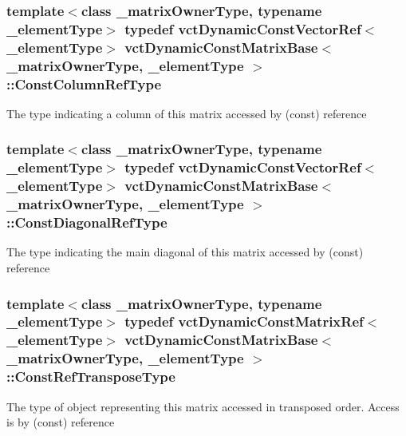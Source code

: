\subsubsection[{Const\+Column\+Ref\+Type}]{\setlength{\rightskip}{0pt plus 5cm}template$<$class \+\_\+matrix\+Owner\+Type, typename \+\_\+element\+Type$>$ typedef {\bf vct\+Dynamic\+Const\+Vector\+Ref}$<$\+\_\+element\+Type$>$ {\bf vct\+Dynamic\+Const\+Matrix\+Base}$<$ \+\_\+matrix\+Owner\+Type, \+\_\+element\+Type $>$\+::{\bf Const\+Column\+Ref\+Type}}\label{classvct_dynamic_const_matrix_base_ac8caf37f979246b1ae99d6e6876879e0}
The type indicating a column of this matrix accessed by (const) reference \hypertarget{classvct_dynamic_const_matrix_base_aa497314340719c9e70a4991d3f306d7e}{}
\subsubsection[{Const\+Diagonal\+Ref\+Type}]{\setlength{\rightskip}{0pt plus 5cm}template$<$class \+\_\+matrix\+Owner\+Type, typename \+\_\+element\+Type$>$ typedef {\bf vct\+Dynamic\+Const\+Vector\+Ref}$<$\+\_\+element\+Type$>$ {\bf vct\+Dynamic\+Const\+Matrix\+Base}$<$ \+\_\+matrix\+Owner\+Type, \+\_\+element\+Type $>$\+::{\bf Const\+Diagonal\+Ref\+Type}}\label{classvct_dynamic_const_matrix_base_aa497314340719c9e70a4991d3f306d7e}
The type indicating the main diagonal of this matrix accessed by (const) reference \hypertarget{classvct_dynamic_const_matrix_base_a2ee053ef5a591f470076e2a0c215fa44}{}
\subsubsection[{Const\+Ref\+Transpose\+Type}]{\setlength{\rightskip}{0pt plus 5cm}template$<$class \+\_\+matrix\+Owner\+Type, typename \+\_\+element\+Type$>$ typedef {\bf vct\+Dynamic\+Const\+Matrix\+Ref}$<$\+\_\+element\+Type$>$ {\bf vct\+Dynamic\+Const\+Matrix\+Base}$<$ \+\_\+matrix\+Owner\+Type, \+\_\+element\+Type $>$\+::{\bf Const\+Ref\+Transpose\+Type}}\label{classvct_dynamic_const_matrix_base_a2ee053ef5a591f470076e2a0c215fa44}
The type of object representing this matrix accessed in transposed order. Access is by (const) reference \hypertarget{classvct_dynamic_const_matrix_base_a42a300cb1afd5f0602ba5c2d7d9cc40b}{}

